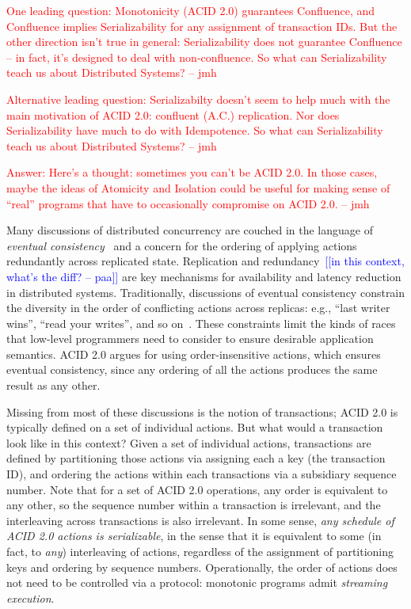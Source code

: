 \documentclass{sig-alternate}
\newcommand{\jmh}[1]{{\textcolor{red}{#1 -- jmh}}}
\newcommand{\paa}[1]{{\textcolor{blue}{[[#1 -- paa]]}}}
\begin{document}
\jmh{One leading question:  Monotonicity (ACID 2.0) guarantees Confluence, and Confluence implies Serializability for any assignment of transaction IDs.  But the other direction isn't true in general: Serializability does not guarantee Confluence -- in fact, it's designed to deal with non-confluence.  So what can Serializability teach us about Distributed Systems?}

\jmh{Alternative leading question: Serializabilty doesn't seem to help much with the main motivation of ACID 2.0: confluent (A.C.) replication. Nor does Serializability have much to do with Idempotence.  So what can Serializability teach us about Distributed Systems?}

\jmh{Answer: Here's a thought: sometimes you can't be ACID 2.0.  In those cases, maybe the ideas of Atomicity and Isolation could be useful for making sense of ``real'' programs that have to occasionally compromise on ACID 2.0.}

Many discussions of distributed concurrency are couched in the language of
\emph{eventual consistency}~\cite{Terry1995} and a concern for the ordering of
applying actions redundantly across replicated state.  Replication and
redundancy~\paa{in this context, what's the diff?} are key mechanisms for availability and latency reduction in
distributed systems.  Traditionally, discussions of eventual consistency
constrain the diversity in the order of conflicting actions across replicas:
e.g., ``last writer wins'', ``read your writes'', and so on~\cite{Terry1994}.
These constraints limit the kinds of races that low-level programmers need to
consider to ensure desirable application semantics.  ACID 2.0 argues for using
order-insensitive actions, which ensures eventual consistency, since any
ordering of all the actions produces the same result as any other.

Missing from most of these discussions is the notion of transactions; ACID 2.0
is typically defined on a set of individual actions.  But what would a
transaction look like in this context?  Given a set of individual actions,
transactions are defined by partitioning those actions via assigning each a key
(the transaction ID), and ordering the actions within each transactions via a
subsidiary sequence number.  Note that for a set of ACID 2.0 operations, any
order is equivalent to any other, so the sequence number within a transaction is
irrelevant, and the interleaving across transactions is also irrelevant.  In
some sense, \emph{any schedule of ACID 2.0 actions is serializable}, in the
sense that it is equivalent to some (in fact, to \emph{any}) interleaving of
actions, regardless of the assignment of partitioning keys and ordering by
sequence numbers.  Operationally, the order of actions does not need to be
controlled via a protocol: monotonic programs admit \emph{streaming execution}.
\end{document}
